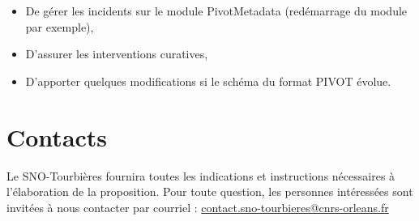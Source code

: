 \documentclass[]{article}
\newcommand{\SNOT}{{SNO-Tourbières}}
\begin{document}
\begin{itemize}
	\item De gérer les incidents sur le module \og{}PivotMetadata\fg{} (redémarrage du module par exemple),
	\item D'assurer les interventions curatives,
	\item D'apporter quelques modifications si le schéma du format PIVOT évolue.
\end{itemize}

\section{Contacts}

Le \SNOT{} fournira toutes les indications et instructions nécessaires à l'élaboration de la proposition.
Pour toute question, les personnes intéressées sont invitées à nous contacter par courriel : \href{mailto:contact.sno-tourbieres@cnrs-orleans.fr}{contact.sno-tourbieres@cnrs-orleans.fr}
\end{document}
